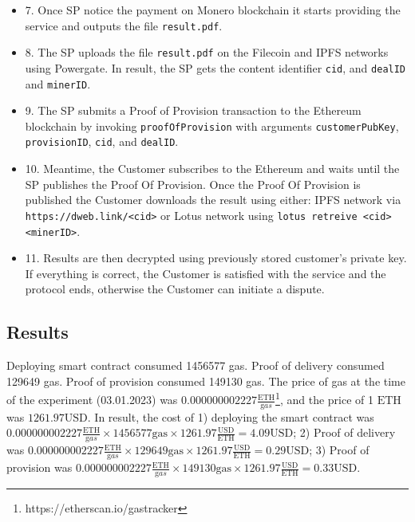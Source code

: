 \documentclass{ieeeaccess}
\begin{document}
\begin{itemize}
  \item 7. Once SP notice the payment on Monero blockchain it starts providing the service and outputs the file \texttt{result.pdf}.

  \item 8. The SP uploads the file \texttt{result.pdf} on the Filecoin and IPFS networks using Powergate. In result, the SP gets the content identifier \texttt{cid}, and \texttt{dealID} and \texttt{minerID}.

  \item 9. The SP submits a Proof of Provision transaction to the Ethereum blockchain by invoking \texttt{proofOfProvision} with arguments \texttt{customerPubKey}, \texttt{provisionID}, \texttt{cid}, and \texttt{dealID}.

  \item 10. Meantime, the Customer subscribes to the Ethereum and waits until the SP publishes the Proof Of Provision.
 Once the Proof Of Provision is published the Customer downloads the result using either: IPFS network via \texttt{https://dweb.link/<cid>} or Lotus network using \texttt{lotus retreive <cid> <minerID>}. 
 
  \item 11. Results are then decrypted using previously stored customer's private key. If everything is correct, the Customer is satisfied with the service and the protocol ends, otherwise the Customer can initiate a dispute.

\end{itemize}

\subsection*{Results}

Deploying smart contract consumed 1456577 gas.
Proof of delivery consumed 129649 gas.
Proof of provision consumed 149130 gas.
The price of gas at the time of the experiment (03.01.2023) was $0.000000002227 \frac{\mathrm{ETH}}{\mathrm gas}$\footnote{https://etherscan.io/gastracker}, and the price of 1 $\mathrm{ETH}$ was $1261.97 \mathrm{USD}$.
In result, the cost of 
1) deploying the smart contract was $0.000000002227 \frac{\mathrm{ETH}}{\mathrm gas} \times 1456577 \mathrm{gas} \times 1261.97 \frac{\mathrm{USD}}{\mathrm{ETH}} = 4.09 \mathrm{USD}$; 
2) Proof of delivery was $0.000000002227 \frac{\mathrm{ETH}}{\mathrm gas} \times 129649 \mathrm{gas} \times 1261.97 \frac{\mathrm{USD}}{\mathrm{ETH}} = 0.29 \mathrm{USD}$; 
3) Proof of provision was $0.000000002227 \frac{\mathrm{ETH}}{\mathrm gas} \times 149130 \mathrm{gas} \times 1261.97 \frac{\mathrm{USD}}{\mathrm{ETH}} = 0.33 \mathrm{USD}$.
\end{document}
